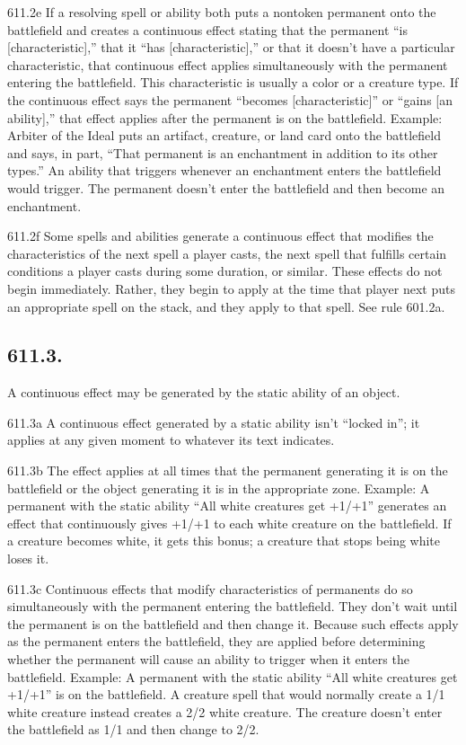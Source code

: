 611.2e If a resolving spell or ability both puts a nontoken permanent onto the battlefield and creates a continuous effect stating that the permanent “is [characteristic],” that it “has [characteristic],” or that it doesn’t have a particular characteristic, that continuous effect applies simultaneously with the permanent entering the battlefield. This characteristic is usually a color or a creature type. If the continuous effect says the permanent “becomes [characteristic]” or “gains [an ability],” that effect applies after the permanent is on the battlefield.
Example: Arbiter of the Ideal puts an artifact, creature, or land card onto the battlefield and says, in part, “That permanent is an enchantment in addition to its other types.” An ability that triggers whenever an enchantment enters the battlefield would trigger. The permanent doesn’t enter the battlefield and then become an enchantment.

611.2f Some spells and abilities generate a continuous effect that modifies the characteristics of the next spell a player casts, the next spell that fulfills certain conditions a player casts during some duration, or similar. These effects do not begin immediately. Rather, they begin to apply at the time that player next puts an appropriate spell on the stack, and they apply to that spell. See rule 601.2a.

\subsection*{611.3.}
A continuous effect may be generated by the static ability of an object.

611.3a A continuous effect generated by a static ability isn’t “locked in”; it applies at any given moment to whatever its text indicates.

611.3b The effect applies at all times that the permanent generating it is on the battlefield or the object generating it is in the appropriate zone.
Example: A permanent with the static ability “All white creatures get +1/+1” generates an effect that continuously gives +1/+1 to each white creature on the battlefield. If a creature becomes white, it gets this bonus; a creature that stops being white loses it.

611.3c Continuous effects that modify characteristics of permanents do so simultaneously with the permanent entering the battlefield. They don’t wait until the permanent is on the battlefield and then change it. Because such effects apply as the permanent enters the battlefield, they are applied before determining whether the permanent will cause an ability to trigger when it enters the battlefield.
Example: A permanent with the static ability “All white creatures get +1/+1” is on the battlefield. A creature spell that would normally create a 1/1 white creature instead creates a 2/2 white creature. The creature doesn’t enter the battlefield as 1/1 and then change to 2/2.

